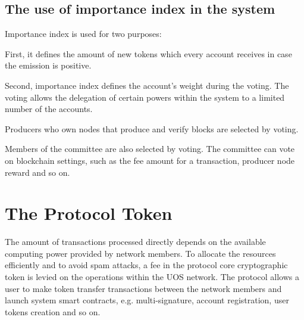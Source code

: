 \documentclass[a4paper,12pt]{article}
\begin{document}
\subsection{The use of importance index in the system}

Importance index is used for two purposes:

First, it defines the amount of new tokens which every account receives in case the emission is positive. 

Second, importance index defines the account’s weight during the voting. The voting allows the delegation  of certain powers within the system to a limited number of the accounts. 

Producers who own nodes that produce and verify blocks are selected by voting.

Members of the committee are also selected by voting. The committee can vote on blockchain settings, such as the fee amount for a transaction, producer node reward and so on. 

% 
% 
% 
% 


\section{The Protocol Token}

The amount of transactions processed directly depends on the available computing power provided by network members. To allocate the resources efficiently and to avoid spam attacks, a fee in the protocol core cryptographic token is levied on the operations within the U{\degree}OS network. The protocol allows a user to make token transfer transactions between the network members and launch system smart contracts, e.g. multi-signature, account registration, user tokens creation and so on.

\end{document}
